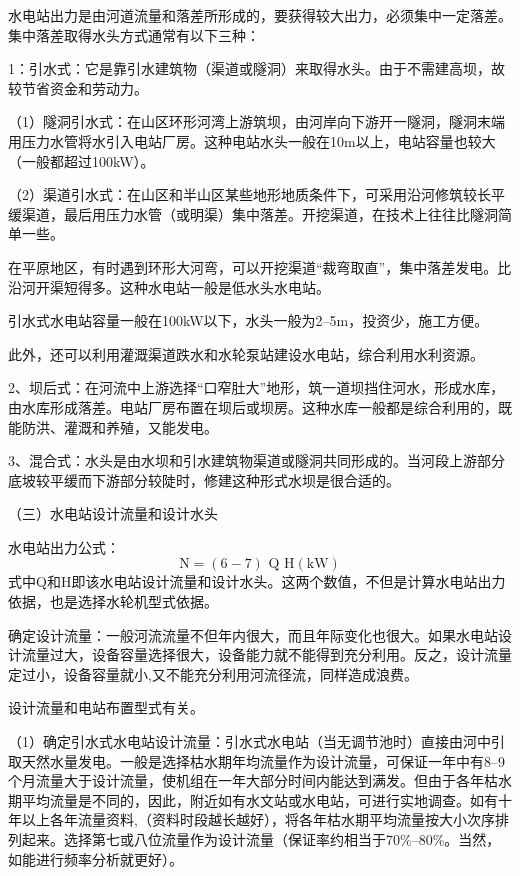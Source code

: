 \documentclass{ctexbook}
\begin{document}
水电站出力是由河道流量和落差所形成的，要获得较大出力，必须集中一定落差。集中落差取得水头方式通常有以下三种：

1：引水式：它是靠引水建筑物（渠道或隧洞）来取得水头。由于不需建高坝，故较节省资金和劳动力。

（1）隧洞引水式：在山区环形河湾上游筑坝，由河岸向下游开一隧洞，隧洞末端用压力水管将水引入电站厂房。这种电站水头一般在10m以上，电站容量也较大（一般都超过100kW）。

（2）渠道引水式：在山区和半山区某些地形地质条件下，可采用沿河修筑较长平缓渠道，最后用压力水管（或明渠）集中落差。开挖渠道，在技术上往往比隧洞简单一些。

在平原地区，有时遇到环形大河弯，可以开挖渠道“裁弯取直”，集中落差发电。比沿河开渠短得多。这种水电站一般是低水头水电站。

引水式水电站容量一般在100kW以下，水头一般为2--5m，投资少，施工方便。

此外，还可以利用灌溉渠道跌水和水轮泵站建设水电站，综合利用水利资源。

2、坝后式：在河流中上游选择“口窄肚大”地形，筑一道坝挡住河水，形成水库，由水库形成落差。电站厂房布置在坝后或坝房。这种水库一般都是综合利用的，既能防洪、灌溉和养殖，又能发电。

3、混合式：水头是由水坝和引水建筑物渠道或隧洞共同形成的。当河段上游部分底坡较平缓而下游部分较陡时，修建这种形式水坝是很合适的。

（三）水电站设计流量和设计水头

水电站出力公式：
\begin{equation*}
\text{N}=(6-7)\text{ Q H} (\text{kW})	
\end{equation*}	
式中Q和H即该水电站设计流量和设计水头。这两个数值，不但是计算水电站出力依据，也是选择水轮机型式依据。

确定设计流量：一般河流流量不但年内很大，而且年际变化也很大。如果水电站设计流量过大，设备容量选择很大，设备能力就不能得到充分利用。反之，设计流量定过小，设备容量就小,又不能充分利用河流径流，同样造成浪费。

设计流量和电站布置型式有关。

（1）确定引水式水电站设计流量：引水式水电站（当无调节池时）直接由河中引取天然水量发电。一般是选择枯水期年均流量作为设计流量，可保证一年中有8--9个月流量大于设计流量，使机组在一年大部分时间内能达到满发。但由于各年枯水期平均流量是不同的，因此，附近如有水文站或水电站，可进行实地调查。如有十年以上各年流量资料,（资料时段越长越好），将各年枯水期平均流量按大小次序排列起来。选择第七或八位流量作为设计流量（保证率约相当于70\%--80\%。当然，如能进行频率分析就更好）。
\end{document}
